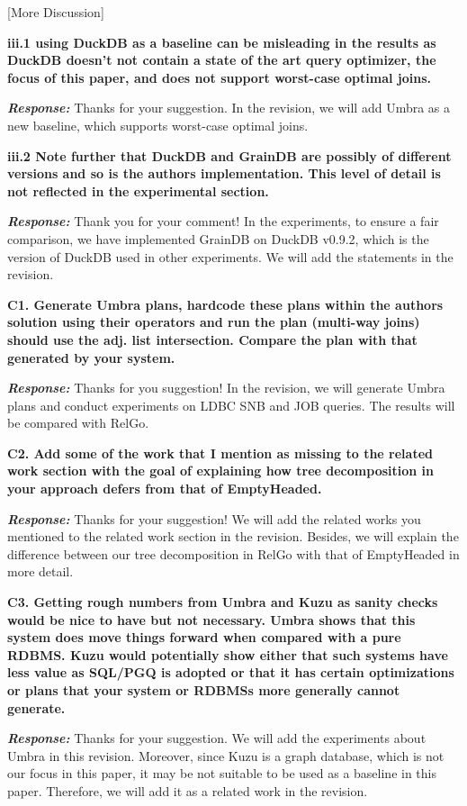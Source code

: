 [More Discussion]


\textbf{
iii.1 using DuckDB as a baseline can be misleading in the results
as DuckDB doesn't not contain a state of the art query optimizer, the focus of this paper, and does not support worst-case optimal joins.}

\textbf{\textit{Response: }}
Thanks for your suggestion. In the revision, we will add Umbra as a new baseline, which supports worst-case optimal joins.

\textbf{
iii.2 Note further that DuckDB and GrainDB are possibly of different versions and so is the authors implementation. This level of detail is not reflected in the experimental section.}

\textbf{\textit{Response: }}
Thank you for your comment! In the experiments, to ensure a fair comparison, we have implemented GrainDB on DuckDB v0.9.2, which is the version of DuckDB used in other experiments. We will add the statements in the revision.


\textbf{
C1. Generate Umbra plans, hardcode these plans within the authors solution using their operators and run the plan (multi-way joins) should use the adj. list intersection. Compare the plan with that generated by your system. }

\textbf{\textit{Response: }}
Thanks for you suggestion! In the revision, we will generate Umbra plans and conduct experiments on LDBC SNB and JOB queries. The results will be compared with RelGo.

\textbf{
C2. Add some of the work that I mention as missing to the related work section with the goal of explaining how tree decomposition in your approach defers from that of EmptyHeaded. }

\textbf{\textit{Response: }} Thanks for your suggestion! We will add the related works you mentioned to the related work section in the revision. Besides, we will explain the difference between our tree decomposition in RelGo with that of EmptyHeaded in more detail.


\textbf{
C3. Getting rough numbers from Umbra and Kuzu as sanity checks would be nice to have but not necessary. Umbra shows that this system does move things forward when compared with a pure RDBMS. Kuzu would potentially show either that such systems have less value as SQL/PGQ is adopted or that it has certain optimizations or plans that your system or RDBMSs more generally cannot generate. }

\textbf{\textit{Response: }}
Thanks for your suggestion. We will add the experiments about Umbra in this revision. Moreover, since Kuzu is a graph database, which is not our focus in this paper, it may be not suitable to be used as a baseline in this paper. Therefore, we will add it as a related work in the revision.


